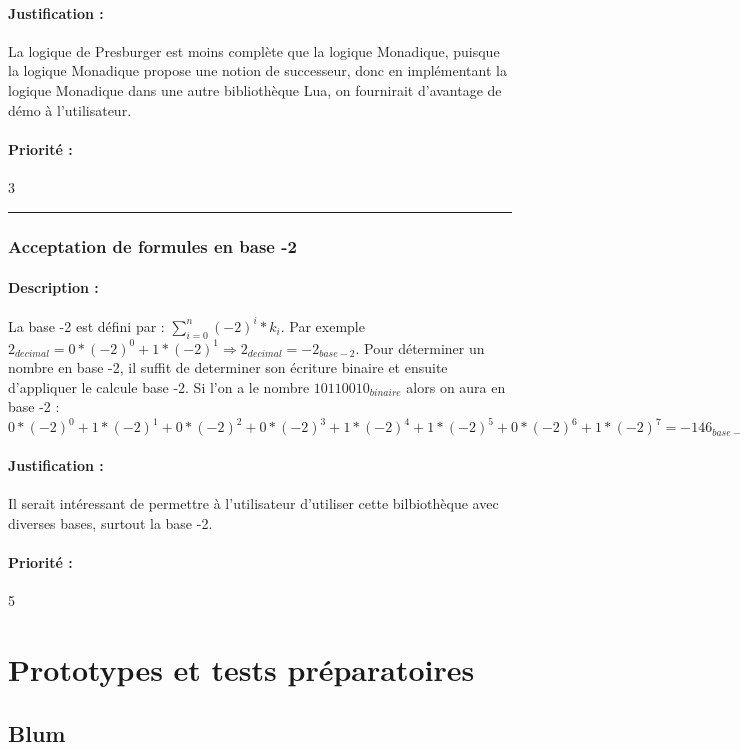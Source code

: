 \documentclass{article}%
\begin{document}
\paragraph{Justification :} La logique de Presburger est moins complète que la logique Monadique, puisque la logique Monadique propose une notion de successeur, donc en implémentant la logique Monadique dans une autre bibliothèque Lua, on fournirait d'avantage de démo à l'utilisateur.

\paragraph{Priorité :} 3\\

\rule{\linewidth}{1pt}

\subsubsection{Acceptation de formules en base -2}

\paragraph{Description :} La base -2 est défini par : $ \sum\limits_{i=0}^n (-2)^i * k_i$. Par exemple $2_{decimal} = 0 * (-2)^0 + 1 * (-2)^1 \Rightarrow 2_{decimal} = -2_{base - 2}$. Pour déterminer un nombre en base -2, il suffit de determiner son écriture binaire et ensuite d'appliquer le calcule base -2. Si l'on a le nombre $10110010_{binaire}$ alors on aura en base -2 : $0 * (-2)^0 + 1 * (-2)^1 + 0 * (-2)^2 + 0 * (-2)^3 + 1 * (-2)^4 + 1 * (-2)^5 + 0 * (-2)^6 + 1 * (-2)^7 = -146_{base - 2}$

\paragraph{Justification :} Il serait intéressant de permettre à l'utilisateur d'utiliser cette bilbiothèque avec diverses bases, surtout la base -2.

\paragraph{Priorité :} 5

\section{Prototypes et tests préparatoires}

\subsection{Blum}
\end{document}

